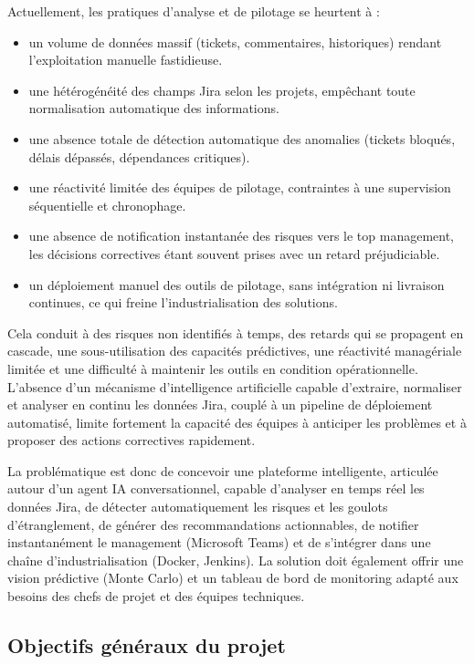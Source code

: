 Actuellement, les pratiques d’analyse et de pilotage se heurtent à :
\begin{itemize}
    \renewcommand{\labelitemi}{—}
    \item un volume de données massif (tickets, commentaires, historiques) rendant l’exploitation manuelle fastidieuse.
    \item une hétérogénéité des champs Jira selon les projets, empêchant toute normalisation automatique des informations.
    \item une absence totale de détection automatique des anomalies (tickets bloqués, délais dépassés, dépendances critiques).
    \item une réactivité limitée des équipes de pilotage, contraintes à une supervision séquentielle et chronophage.
    \item une absence de notification instantanée des risques vers le top management, les décisions correctives étant souvent prises avec un retard préjudiciable.
    \item un déploiement manuel des outils de pilotage, sans intégration ni livraison continues, ce qui freine l’industrialisation des solutions.
\end{itemize}

Cela conduit à des risques non identifiés à temps, des retards qui se propagent en cascade, une sous-utilisation des capacités prédictives, une réactivité managériale limitée et une difficulté à maintenir les outils en condition opérationnelle. L’absence d’un mécanisme d’intelligence artificielle capable d’extraire, normaliser et analyser en continu les données Jira, couplé à un pipeline de déploiement automatisé, limite fortement la capacité des équipes à anticiper les problèmes et à proposer des actions correctives rapidement.

La problématique est donc de concevoir une plateforme intelligente, articulée autour d’un agent IA conversationnel, capable d’analyser en temps réel les données Jira, de détecter automatiquement les risques et les goulots d’étranglement, de générer des recommandations actionnables, de notifier instantanément le management (Microsoft Teams) et de s’intégrer dans une chaîne d’industrialisation (Docker, Jenkins). La solution doit également offrir une vision prédictive (Monte Carlo) et un tableau de bord de monitoring adapté aux besoins des chefs de projet et des équipes techniques.


\subsection{Objectifs généraux du projet}

